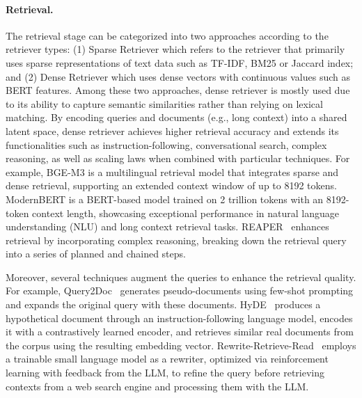 \documentclass[11pt, a4paper, logo, copyright, nonumbering]{map}
\begin{document}
\paragraph{Retrieval.} 
The retrieval stage can be categorized into two approaches according to the retriever types: 
(1) Sparse Retriever which refers to the retriever that primarily uses sparse representations of text data such as TF-IDF\citep{drqa}, BM25\citep{toolformer} or Jaccard index\citep{zhang2023repocoder}; and (2) Dense Retriever which uses dense vectors with continuous values such as BERT\citep{devlin-etal-2019-bert} features. Among these two approaches, dense retriever is mostly used due to its ability to capture semantic similarities rather than relying on lexical matching. By encoding queries and documents (e.g., long context) into a shared latent space, dense retriever achieves higher retrieval accuracy and extends its functionalities such as instruction-following\citep{gritlm}, conversational search\citep{mo2024survey}, complex reasoning\citep{joshi2024reaper}, as well as scaling laws\citep{fang2024scaling} when combined with particular techniques. 
For example, 
BGE-M3\citep{chen2024bge} is a multilingual retrieval model that integrates sparse and dense retrieval, supporting an extended context window of up to 8192 tokens. 
ModernBERT\citep{warner2024smarter0} is a BERT-based model trained on 2 trillion tokens with an 8192-token context length, showcasing exceptional performance in natural language understanding (NLU) and long context retrieval tasks. 
REAPER~\citep{joshi2024reaper} enhances retrieval by incorporating complex reasoning, breaking down the retrieval query into a series of planned and chained steps.

Moreover, several techniques augment the queries to enhance the retrieval quality. 
For example, 
Query2Doc~\citep{wang2023query2doc0} generates pseudo-documents using few-shot prompting and expands the original query with these documents. 
HyDE~\citep{hyde} produces a hypothetical document through an instruction-following language model, encodes it with a contrastively learned encoder, and retrieves similar real documents from the corpus using the resulting embedding vector. 
Rewrite-Retrieve-Read~\citep{ma2023query} employs a trainable small language model as a rewriter, optimized via reinforcement learning with feedback from the LLM, to refine the query before retrieving contexts from a web search engine and processing them with the LLM.
\end{document}
